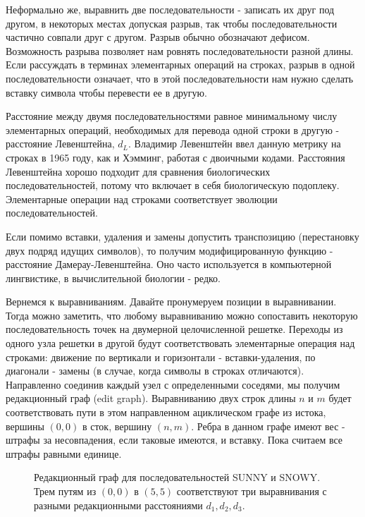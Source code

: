 \documentclass[letterpaper, 11pt]{article}
\begin{document}
Неформально же, выравнить две последовательности - записать их друг под другом, в некоторых местах допуская разрыв, так чтобы последовательности частично совпали друг с другом. Разрыв обычно обозначают дефисом. Возможность разрыва позволяет нам ровнять последовательности разной длины. Если рассуждать в терминах элементарных операций на строках, разрыв в одной последовательности означает, что в этой последовательности нам нужно сделать вставку символа чтобы перевести ее в другую.

Расстояние между двумя последовательностями равное минимальному числу элементарных операций, необходимых для перевода одной строки в другую - расстояние Левенштейна, $d_L$. Владимир Левенштейн ввел данную метрику на строках в 1965 году, как и Хэмминг, работая с двоичными кодами. Расстояния Левенштейна хорошо подходит для сравнения биологических последовательностей, потому что включает в себя биологическую подоплеку. Элементарные операции над строками соответствует эволюции последовательностей.

Если помимо вставки, удаления и замены допустить транспозицию (перестановку двух подряд идущих символов), то получим модифицированную функцию - расстояние Дамерау-Левенштейна. Оно часто используется в компьютерной лингвистике, в вычислительной биологии - редко.

Вернемся к выравниваниям. Давайте пронумеруем позиции в выравнивании. Тогда можно заметить, что любому выравниванию можно сопоставить некоторую последовательность точек на двумерной целочисленной решетке. Переходы из одного узла решетки в другой будут соответствовать элементарные операция над строками: движение по вертикали и горизонтали - вставки-удаления, по диагонали - замены (в случае, когда символы в строках отличаются). Направленно соединив каждый узел с определенными соседями, мы получим редакционный граф (edit graph). Выравниванию двух строк длины $n$ и $m$ будет соответствовать пути в этом направленном ациклическом графе из истока, вершины $(0,0)$ в сток, вершину $(n,m)$. Ребра в данном графе имеют вес - штрафы за несовпадения, если таковые имеются, и вставку. Пока считаем все штрафы равными единице.

\begin{figure}[H]
  \caption{Редакционный граф для последовательностей SUNNY и SNOWY. Трем путям из $(0,0)$ в $(5,5)$ соответствуют три выравнивания с разными редакционными расстояниями $d_1,d_2,d_3$.}
\end{figure}
\end{document}
